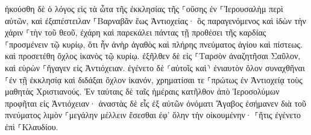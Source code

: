 \documentclass{openreader}
\begin{document}
ἠκούσθη δὲ ὁ λόγος εἰς τὰ ὦτα τῆς ἐκκλησίας τῆς ⸀οὔσης ἐν ⸀Ἰερουσαλὴμ περὶ αὐτῶν, καὶ ἐξαπέστειλαν ⸀Βαρναβᾶν ἕως Ἀντιοχείας· 
ὃς παραγενόμενος καὶ ἰδὼν τὴν χάριν ⸀τὴν τοῦ θεοῦ, ἐχάρη καὶ παρεκάλει πάντας τῇ προθέσει τῆς καρδίας ⸀προσμένειν τῷ κυρίῳ, 
ὅτι ἦν ἀνὴρ ἀγαθὸς καὶ πλήρης πνεύματος ἁγίου καὶ πίστεως. καὶ προσετέθη ὄχλος ἱκανὸς τῷ κυρίῳ. 
ἐξῆλθεν δὲ εἰς ⸀Ταρσὸν ἀναζητῆσαι Σαῦλον, 
καὶ εὑρὼν ⸀ἤγαγεν εἰς Ἀντιόχειαν. ἐγένετο δὲ ⸂αὐτοῖς καὶ⸃ ἐνιαυτὸν ὅλον συναχθῆναι ⸀ἐν τῇ ἐκκλησίᾳ καὶ διδάξαι ὄχλον ἱκανόν, χρηματίσαι τε ⸀πρώτως ἐν Ἀντιοχείᾳ τοὺς μαθητὰς Χριστιανούς. 
Ἐν ταύταις δὲ ταῖς ἡμέραις κατῆλθον ἀπὸ Ἱεροσολύμων προφῆται εἰς Ἀντιόχειαν· 
ἀναστὰς δὲ εἷς ἐξ αὐτῶν ὀνόματι Ἅγαβος ἐσήμανεν διὰ τοῦ πνεύματος λιμὸν ⸀μεγάλην μέλλειν ἔσεσθαι ἐφ’ ὅλην τὴν οἰκουμένην· ⸀ἥτις ἐγένετο ἐπὶ ⸀Κλαυδίου. 
\end{document}
